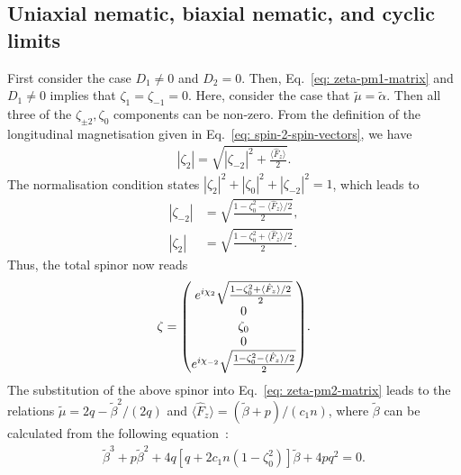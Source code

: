 \subsection{Uniaxial nematic, biaxial nematic, and cyclic limits}
First consider the case \(D_1 \neq 0\) and \(D_2 = 0\).
Then, Eq.~\eqref{eq: zeta-pm1-matrix} and \(D_1 \neq 0\) implies that
\(\zeta_1=\zeta_{-1}=0\).
Here, consider the case that \(\tilde{\mu} = \tilde{\alpha}\).
Then all three of the \(\zeta_{\pm 2}, \zeta_0\) components can be non-zero.
From the definition of the longitudinal magnetisation given in
Eq.~\eqref{eq: spin-2-spin-vectors}, we have
\begin{align}
    |\zeta_2| = \sqrt{|\zeta_{-2}|^2 + \frac{\langle\hat{F}_z\rangle}{2}}.
\end{align}
The normalisation condition states \(|\zeta_2|^2 + |\zeta_0|^2 +
|\zeta_{-2}|^2=1\), which leads to
\begin{align}
    |\zeta_{-2}| &= \sqrt{\frac{1 - \zeta_0^2 -\langle\hat{F}_z\rangle/2}{2}},\\
    |\zeta_2| &= \sqrt{\frac{1 - \zeta_0^2 + \langle\hat{F}_z\rangle/2}{2}}.
\end{align}
Thus, the total spinor now reads
\begin{align}\label{eq: intermediate-UN-BN}
    \zeta = \mqty(
        e^{i\chi_2}\sqrt{\frac{1 - \zeta_0^2 + \langle\hat{F}_z\rangle/2}{2}} \\
        0 \\
        \zeta_0 \\
        0 \\
        e^{i\chi_{-2}}\sqrt{\frac{1 -\zeta_0^2 - \langle\hat{F}_z\rangle/2}{2}}
    ).
\end{align}
The substitution of the above spinor into Eq.~\eqref{eq: zeta-pm2-matrix} leads
to the relations \(\tilde{\mu} = 2q-\tilde{\beta}^2/(2q)\) and
\(\langle\hat{F}_z\rangle = (\tilde{\beta} + p)/(c_1n)\), where
\(\tilde{\beta}\) can be calculated from the following
equation~\cite{Kawaguchi2012}:
\begin{align}
    \tilde{\beta}^3 +p\tilde{\beta}^2 + 4q[q + 2c_1n(1-\zeta_0^2)]\tilde{\beta}
    + 4pq^2 = 0.
\end{align}

